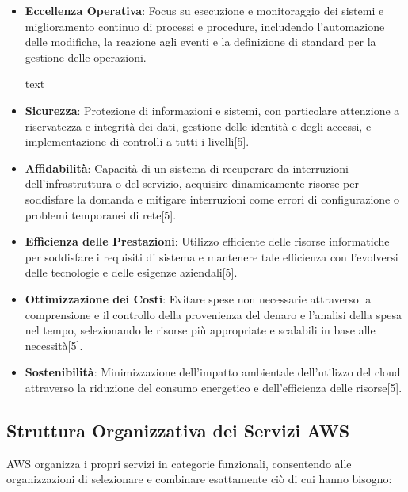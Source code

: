 \documentclass[a4paper,12pt]{report}
\begin{document}
\begin{itemize}
\item \textbf{Eccellenza Operativa}: Focus su esecuzione e monitoraggio dei sistemi e miglioramento continuo di processi e procedure, includendo l'automazione delle modifiche, la reazione agli eventi e la definizione di standard per la gestione delle operazioni.

text
\item \textbf{Sicurezza}: Protezione di informazioni e sistemi, con particolare attenzione a riservatezza e integrità dei dati, gestione delle identità e degli accessi, e implementazione di controlli a tutti i livelli[5].

\item \textbf{Affidabilità}: Capacità di un sistema di recuperare da interruzioni dell'infrastruttura o del servizio, acquisire dinamicamente risorse per soddisfare la domanda e mitigare interruzioni come errori di configurazione o problemi temporanei di rete[5].

\item \textbf{Efficienza delle Prestazioni}: Utilizzo efficiente delle risorse informatiche per soddisfare i requisiti di sistema e mantenere tale efficienza con l'evolversi delle tecnologie e delle esigenze aziendali[5].

\item \textbf{Ottimizzazione dei Costi}: Evitare spese non necessarie attraverso la comprensione e il controllo della provenienza del denaro e l'analisi della spesa nel tempo, selezionando le risorse più appropriate e scalabili in base alle necessità[5].

\item \textbf{Sostenibilità}: Minimizzazione dell'impatto ambientale dell'utilizzo del cloud attraverso la riduzione del consumo energetico e dell'efficienza delle risorse[5].
\end{itemize}

\subsection{Struttura Organizzativa dei Servizi AWS}

AWS organizza i propri servizi in categorie funzionali, consentendo alle organizzazioni di selezionare e combinare esattamente ciò di cui hanno bisogno:
\end{document}
